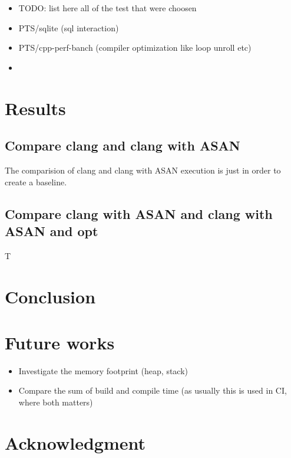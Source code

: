 \documentclass[letterpaper, 10 pt]{llncs}
\begin{document}
\begin{itemize}
	\item TODO: list here all of the test that were choosen
	\item PTS/sqlite (sql interaction)
	\item PTS/cpp-perf-banch (compiler optimization like loop unroll etc)
	\item 
\end{itemize}


\section{Results}

\subsection{Compare clang and clang with ASAN}

The comparision of clang and clang with ASAN execution is just in order to create a baseline.

\subsection{Compare clang with ASAN and clang with ASAN and opt}

T


\section{Conclusion}

\section{Future works}


\begin{itemize}
	\item Investigate the memory footprint (heap, stack)
	\item Compare the sum of build and compile time (as usually this is used in CI, where both matters)
\end{itemize}




\addtolength{\textheight}{-12cm}   %








\section*{Acknowledgment}



\printbibliography
\end{document}

